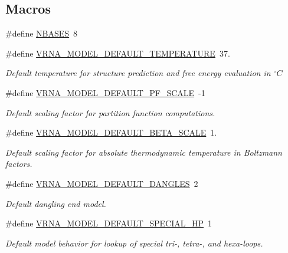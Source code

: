 \subsection*{Macros}
\begin{DoxyCompactItemize}
\item 
\#define \mbox{\hyperlink{group__model__details_gad554b4852cd5fec35025db8edbbba3cd}{N\+B\+A\+S\+ES}}~8
\item 
\#define \mbox{\hyperlink{group__model__details_gaf47f9850b3b4763479f7a7e7a15648a2}{V\+R\+N\+A\+\_\+\+M\+O\+D\+E\+L\+\_\+\+D\+E\+F\+A\+U\+L\+T\+\_\+\+T\+E\+M\+P\+E\+R\+A\+T\+U\+RE}}~37.
\begin{DoxyCompactList}\small\item\em   Default temperature for structure prediction and free energy evaluation in $^\circ C$  \end{DoxyCompactList}\item 
\#define \mbox{\hyperlink{group__model__details_ga5505389cba74a18bbc116d2bb20256fa}{V\+R\+N\+A\+\_\+\+M\+O\+D\+E\+L\+\_\+\+D\+E\+F\+A\+U\+L\+T\+\_\+\+P\+F\+\_\+\+S\+C\+A\+LE}}~-\/1
\begin{DoxyCompactList}\small\item\em Default scaling factor for partition function computations. \end{DoxyCompactList}\item 
\#define \mbox{\hyperlink{group__model__details_ga383d3ac8d08c3b6221754b50871c1200}{V\+R\+N\+A\+\_\+\+M\+O\+D\+E\+L\+\_\+\+D\+E\+F\+A\+U\+L\+T\+\_\+\+B\+E\+T\+A\+\_\+\+S\+C\+A\+LE}}~1.
\begin{DoxyCompactList}\small\item\em Default scaling factor for absolute thermodynamic temperature in Boltzmann factors. \end{DoxyCompactList}\item 
\#define \mbox{\hyperlink{group__model__details_ga2aa7bc2cae774b83a5c468f824c27a42}{V\+R\+N\+A\+\_\+\+M\+O\+D\+E\+L\+\_\+\+D\+E\+F\+A\+U\+L\+T\+\_\+\+D\+A\+N\+G\+L\+ES}}~2
\begin{DoxyCompactList}\small\item\em Default dangling end model. \end{DoxyCompactList}\item 
\#define \mbox{\hyperlink{group__model__details_gabd1ab224e1048defd45c165ed7d1c108}{V\+R\+N\+A\+\_\+\+M\+O\+D\+E\+L\+\_\+\+D\+E\+F\+A\+U\+L\+T\+\_\+\+S\+P\+E\+C\+I\+A\+L\+\_\+\+HP}}~1
\begin{DoxyCompactList}\small\item\em Default model behavior for lookup of special tri-\/, tetra-\/, and hexa-\/loops. \end{DoxyCompactList}\item 

\end{DoxyCompactItemize}
